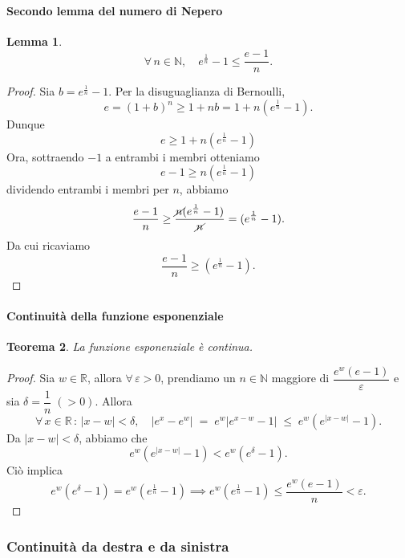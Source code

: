 \documentclass{article}
\theoremstyle{plain}
\newtheorem{thm}{Teorema}[section]
\newtheorem{lem}[thm]{Lemma}
\theoremstyle{definition}
\theoremstyle{remark}
\begin{document}
\vspace{10pt}

\paragraph{Secondo lemma del numero di Nepero}
\begin{bxthm}
\begin{lem}
    \[\forall\,n\in\mathbb{N},\quad e^{\frac{1}{n}}-1\leq\dfrac{e-1}{n}.\]
\end{lem}
\end{bxthm}
\begin{proof}
    Sia $b=e^{\frac{1}{n}}-1$. Per la disuguaglianza di Bernoulli, 
    \[e=(1+b)^n\geq 1+nb=1+n(e^{\frac{1}{n}}-1).\]
    Dunque 
    \[e\geq 1+n(e^{\frac{1}{n}}-1)\]
    Ora, sottraendo $-1$ a entrambi i membri otteniamo
    \[e-1\geq n(e^{\frac{1}{n}}-1)\]
    dividendo entrambi i membri per $n$, abbiamo
    \[\dfrac{e-1}{n}\geq \dfrac{\cancel{n}(e^{\frac{1}{n}}-1)}{\cancel{n}}=(e^{\frac{1}{n}}-1).\]
    Da cui ricaviamo \[\frac{e-1}{n}\geq(e^{\frac{1}{n}}-1).\]
\end{proof}

\vspace{10pt}

\paragraph{Continuità della funzione esponenziale}
\begin{bxthm}
\begin{thm}
    La funzione esponenziale è continua.
\end{thm}
\end{bxthm}
\begin{proof}
    Sia $w\in\mathbb{R}$, allora $\forall\, \varepsilon >0$, prendiamo un $n\in\mathbb{N}$ maggiore di $\dfrac{e^w(e-1)}{\varepsilon}$ e sia $\delta=\dfrac{1}{n}\;(>0)$.
    Allora \[\forall\, x\in\mathbb{R}\,:\,|x-w|<\delta,\quad |e^x-e^w|\;=\;e^w|e^{x-w}-1|\;\leq\; e^w(e^{|x-w|}-1).\] 
    Da $|x-w|<\delta$, abbiamo che \[e^w(e^{|x-w|}-1)<e^w(e^\delta-1).\]
    Ciò implica 
    \[e^w(e^\delta-1)=e^w(e^{\frac{1}{n}}-1)\implies e^w(e^{\frac{1}{n}}-1)\leq\dfrac{e^w(e-1)}{n}<\varepsilon.\]
\end{proof}

\vspace{10pt}

\subsubsection{Continuità da destra e da sinistra}
\end{document}
